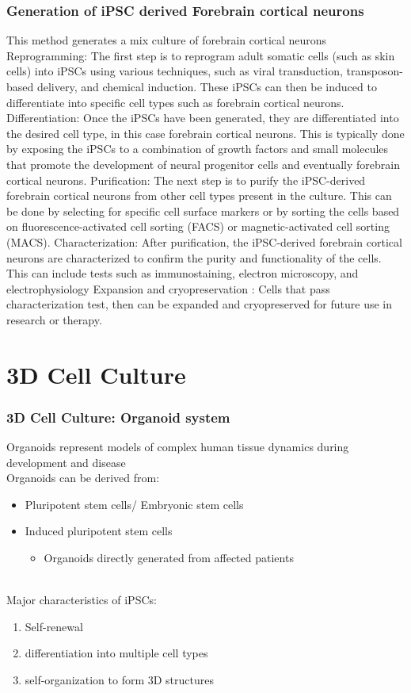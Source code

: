 \begin{itemize}
\subsubsection{Generation of iPSC derived Forebrain cortical neurons}
This method generates a mix culture of forebrain cortical neurons
Reprogramming: The first step is to reprogram adult somatic cells (such as skin cells) into iPSCs using various techniques, such as viral transduction, transposon-based delivery, and chemical induction. These iPSCs can then be induced to differentiate into specific cell types such as forebrain cortical neurons.
Differentiation: Once the iPSCs have been generated, they are differentiated into the desired cell type, in this case forebrain cortical neurons. This is typically done by exposing the iPSCs to a combination of growth factors and small molecules that promote the development of neural progenitor cells and eventually forebrain cortical neurons.
Purification: The next step is to purify the iPSC-derived forebrain cortical neurons from other cell types present in the culture. This can be done by selecting for specific cell surface markers or by sorting the cells based on fluorescence-activated cell sorting (FACS) or magnetic-activated cell sorting (MACS).
Characterization: After purification, the iPSC-derived forebrain cortical neurons are characterized to confirm the purity and functionality of the cells. This can include tests such as immunostaining, electron microscopy, and electrophysiology
Expansion and cryopreservation : Cells that pass characterization test, then can be expanded and cryopreserved for future use in research or therapy.
\section{3D Cell Culture}
\subsubsection{3D Cell Culture: Organoid system}
Organoids represent models of complex human tissue dynamics during development and disease
\\Organoids can be derived from:
\begin{itemize}
    \item Pluripotent stem cells/ Embryonic stem cells
    \item Induced pluripotent stem cells
    \begin{itemize}
        \item Organoids directly generated from affected patients
    \end{itemize}
\end{itemize}
\\Major characteristics of iPSCs: 
\begin{enumerate}
    \item Self-renewal
    \item differentiation into multiple cell types
    \item self-organization to form 3D structures
\end{enumerate}

\end{itemize}
